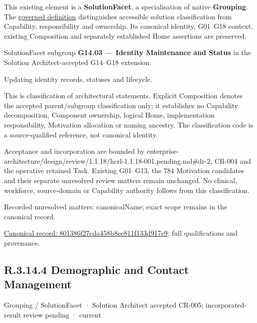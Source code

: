 This existing element is a \textbf{SolutionFacet}, a specialisation of native
\textbf{Grouping}. The \href{\detokenize{../../../../../../../governance/continuum-representation.md#solutionfacet-classification--1119-candidate}}{governed definition}
distinguishes accessible solution classification from Capability, responsibility
and ownership. Its canonical identity, G01–G18 context, existing Composition
and separately established Home assertions are preserved.



SolutionFacet subgroup \textbf{G14.03 — Identity Maintenance and Status} in the Solution Architect-accepted G14–G18 extension.



Updating identity records, statuses and lifecycle.



This is classification of architectural statements. Explicit Composition denotes the accepted parent/subgroup classification only; it establishes no Capability decomposition, Component ownership, logical Home, implementation responsibility, Motivation allocation or naming ancestry. The classification code is a source-qualified reference, not canonical identity.



Acceptance and incorporation are bounded by enterprise-architecture/design/review/1.1.18/hcrl-1.1.18-001.pending.md\#dr-2, CR-004 and the operative retained Task. Existing G01–G13, the 784 Motivation candidates and their separate unresolved review matters remain unchanged. No clinical, workforce, source-domain or Capability authority follows from this classification.


{\small Recorded unresolved matters: canonicalName; exact scope remains in the canonical record.}\par
{\footnotesize \href{../../../../../../../continuum/grouping/801386f27cda458b8ce811f133d917e9.md}{Canonical record: 801386f27cda458b8ce811f133d917e9}; full qualifications and provenance.}\par
\subsection*{R.3.14.4 Demographic and Contact Management}
\label{navigation:R.3.14.4}

\label{element:58c5443983854dd98cd72f2dd795c063}
{\small Grouping / SolutionFacet · Solution Architect accepted CR-005; incorporated-result review pending · current}\par

